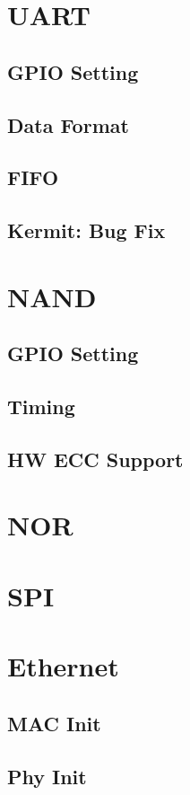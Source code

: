 \section{UART}
\subsection{GPIO Setting}
\subsection{Data Format}
\subsection{FIFO}

\subsection{Kermit: Bug Fix}

\section{NAND}
\subsection{GPIO Setting}
\subsection{Timing}
\subsection{HW ECC Support}

\section{NOR}

\section{SPI}

\section{Ethernet}
\subsection{MAC Init}
\subsection{Phy Init}

